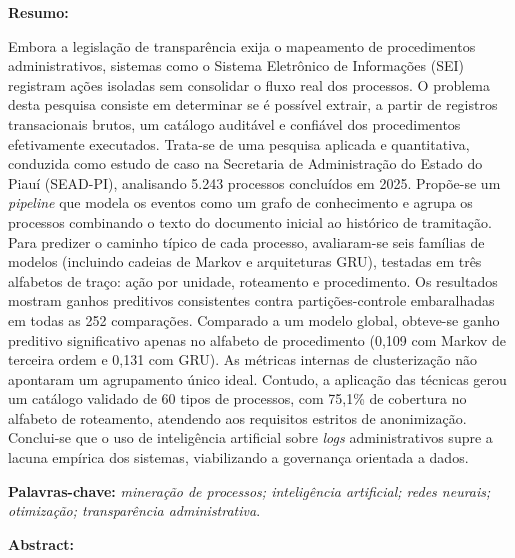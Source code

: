 \noindent\textbf{Resumo:}

\noindent Embora a legislação de transparência exija o mapeamento de procedimentos administrativos, sistemas como o Sistema Eletrônico de Informações (SEI) registram ações isoladas sem consolidar o fluxo real dos processos. O problema desta pesquisa consiste em determinar se é possível extrair, a partir de registros transacionais brutos, um catálogo auditável e confiável dos procedimentos efetivamente executados. Trata-se de uma pesquisa aplicada e quantitativa, conduzida como estudo de caso na Secretaria de Administração do Estado do Piauí (SEAD-PI), analisando 5.243 processos concluídos em 2025. Propõe-se um \emph{pipeline} que modela os eventos como um grafo de conhecimento e agrupa os processos combinando o texto do documento inicial ao histórico de tramitação. Para predizer o caminho típico de cada processo, avaliaram-se seis famílias de modelos (incluindo cadeias de Markov e arquiteturas GRU), testadas em três alfabetos de traço: ação por unidade, roteamento e procedimento. Os resultados mostram ganhos preditivos consistentes contra partições-controle embaralhadas em todas as 252 comparações. Comparado a um modelo global, obteve-se ganho preditivo significativo apenas no alfabeto de procedimento (0,109 com Markov de terceira ordem e 0,131 com GRU). As métricas internas de clusterização não apontaram um agrupamento único ideal. Contudo, a aplicação das técnicas gerou um catálogo validado de 60 tipos de processos, com 75,1\% de cobertura no alfabeto de roteamento, atendendo aos requisitos estritos de anonimização. Conclui-se que o uso de inteligência artificial sobre \emph{logs} administrativos supre a lacuna empírica dos sistemas, viabilizando a governança orientada a dados.

\vspace{0.6\baselineskip}
\noindent\textbf{Palavras-chave:} \textit{mineração de processos; inteligência artificial; redes neurais; otimização; transparência administrativa}.

\vspace{1.2\baselineskip}
\noindent\textbf{Abstract:}

